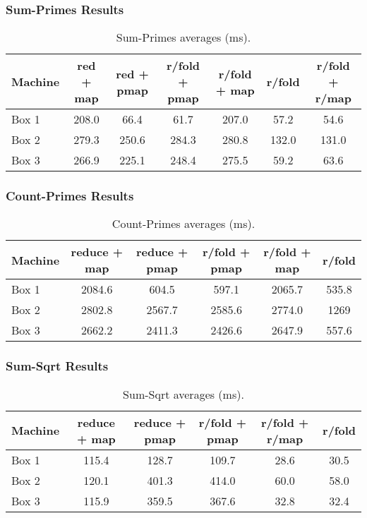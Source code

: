 \documentclass{beamer}
\begin{document}
\begin{frame}
\frametitle{Sum-Primes Results}
\begin{table}
\begin{center}
\begin{tabular}{|l|c|c|c|c|c|c|}
\hline
Machine & red + map & red + pmap & r/fold + pmap & r/fold + map & r/fold & r/fold + r/map \\
\hline
Box 1 & 208.0 & 66.4 & 61.7 & 207.0 & 57.2 &  54.6 \\
Box 2 & 279.3 & 250.6 & 284.3 & 280.8 & 132.0 & 131.0 \\
Box 3 & 266.9 & 225.1 & 248.4 & 275.5 & 59.2 & 63.6 \\
\hline
\end{tabular}
\end{center}
\caption{Sum-Primes averages (ms).}\label{table:sum-primes}
\end{table}
\end{frame}
\begin{frame}
\frametitle{Count-Primes Results}
\begin{table}[h!]
\begin{center}
\begin{tabular}{|l|c|c|c|c|c|}
\hline
Machine & reduce + map & reduce + pmap & r/fold + pmap & r/fold + map & r/fold\\
\hline
Box 1 & 2084.6 & 604.5 & 597.1 & 2065.7 & 535.8\\
Box 2 & 2802.8 & 2567.7 & 2585.6 & 2774.0 & 1269 \\
Box 3 & 2662.2 & 2411.3 & 2426.6 & 2647.9 & 557.6\\
\hline
\end{tabular}
\end{center}
\caption{Count-Primes averages (ms).}\label{table:count-primes}
\end{table}
\end{frame}
\begin{frame}
\frametitle{Sum-Sqrt Results}

\begin{table}[h!]
\begin{center}
\begin{tabular}{|l|c|c|c|c|c|}
\hline
Machine & reduce + map & reduce + pmap & r/fold + pmap & r/fold + r/map & r/fold\\
\hline
Box 1 & 115.4 & 128.7 & 109.7 & 28.6 & 30.5\\
Box 2 & 120.1 & 401.3 & 414.0 & 60.0 & 58.0 \\
Box 3 & 115.9 & 359.5 & 367.6 & 32.8 & 32.4\\
\hline
\end{tabular}
\end{center}
\caption{Sum-Sqrt averages (ms).}\label{table:sum-sqrt}
\end{table}
\end{frame}
\end{document}
